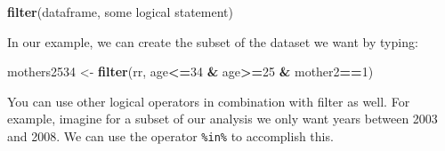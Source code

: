 \documentclass[
]{book}
\newenvironment{Shaded}{\begin{snugshade}}{\end{snugshade}}
\newcommand{\DecValTok}[1]{\textcolor[rgb]{0.00,0.00,0.81}{#1}}
\newcommand{\FunctionTok}[1]{\textcolor[rgb]{0.13,0.29,0.53}{\textbf{#1}}}
\newcommand{\NormalTok}[1]{#1}
\newcommand{\OtherTok}[1]{\textcolor[rgb]{0.56,0.35,0.01}{#1}}
\newcommand{\SpecialCharTok}[1]{\textcolor[rgb]{0.81,0.36,0.00}{\textbf{#1}}}
\begin{document}
\begin{Shaded}
\begin{Highlighting}[]
\FunctionTok{filter}\NormalTok{(dataframe, some logical statement)}
\end{Highlighting}
\end{Shaded}

In our example, we can create the subset of the dataset we want by typing:

\begin{Shaded}
\begin{Highlighting}[]
\NormalTok{mothers2534 }\OtherTok{\textless{}{-}} \FunctionTok{filter}\NormalTok{(rr, age}\SpecialCharTok{\textless{}=}\DecValTok{34} \SpecialCharTok{\&}\NormalTok{ age}\SpecialCharTok{\textgreater{}=}\DecValTok{25} \SpecialCharTok{\&}\NormalTok{ mother2}\SpecialCharTok{==}\DecValTok{1}\NormalTok{)}
\end{Highlighting}
\end{Shaded}

You can use other logical operators in combination with filter as well. For example, imagine for a subset of our analysis we only want years between 2003 and 2008. We can use the operator \texttt{\%in\%} to accomplish this.
\end{document}
